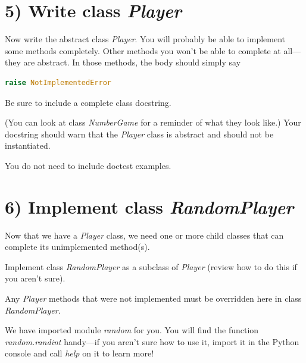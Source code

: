 \documentclass[12pt]{article}
\begin{document}
\bigskip

\section*{5) Write class \textit{Player}}

\bigskip

Now write the abstract class \textit{Player}. You will probably be able to implement
some methods completely. Other methods you won’t be able to complete at all—they
are abstract. In those methods, the body should simply say

\bigskip

\begin{lstlisting}[language=Python]
    raise NotImplementedError
\end{lstlisting}

\bigskip

\noindent Be sure to include a complete class docstring.

\bigskip

\noindent (You can look at class \textit{NumberGame} for a reminder of what they look like.)
Your docstring should warn that the \textit{Player} class is abstract and should
not be instantiated.

\bigskip

\noindent You do not need to include doctest examples.

\bigskip

\section*{6) Implement class \textit{RandomPlayer}}

\bigskip

Now that we have a \textit{Player} class, we need one or more child classes that can complete
its unimplemented method(s).

\bigskip

\noindent Implement class \textit{RandomPlayer} as a subclass of \textit{Player} (review how
to do this if you aren’t sure).

\bigskip

\noindent Any \textit{Player} methods that were not implemented must be overridden here in
class \textit{RandomPlayer}.

\bigskip

\noindent We have imported module \textit{random} for you.
You will find the function \textit{random.randint} handy—if you aren’t sure how
to use it, import it in the Python console and call \textit{help} on it to learn more!
\end{document}
